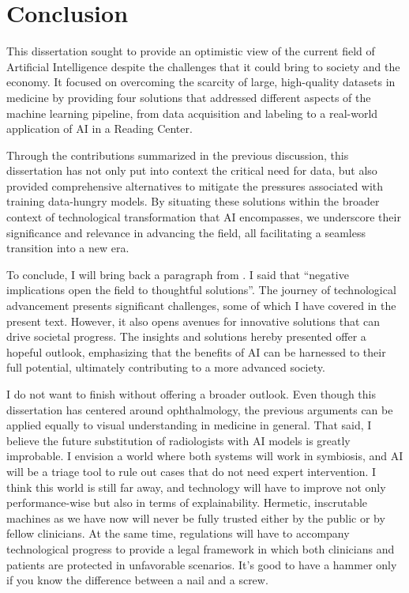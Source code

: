 \graphicspath{{ch8_conclusion/}{Figures/}}

\chapter{Conclusion}
\label{chapter:conclusion}




This dissertation sought to provide an optimistic view of the current field of Artificial Intelligence despite the challenges that it could bring to society and the economy. It focused on overcoming the scarcity of large, high-quality datasets in medicine by providing four solutions that addressed different aspects of the machine learning pipeline, from data acquisition and labeling to a real-world application of AI in a Reading Center.

Through the contributions summarized in the previous discussion, this dissertation has not only put into context the critical need for data, but also provided comprehensive alternatives to mitigate the pressures associated with training data-hungry models. By situating these solutions within the broader context of technological transformation that AI encompasses, we underscore their significance and relevance in advancing the field, all facilitating a seamless transition into a new era.

To conclude, I will bring back a paragraph from . I said that ``negative implications open the field to thoughtful solutions''. The journey of technological advancement presents significant challenges, some of which I have covered in the present text. However, it also opens avenues for innovative solutions that can drive societal progress. The insights and solutions hereby presented offer a hopeful outlook, emphasizing that the benefits of AI can be harnessed to their full potential, ultimately contributing to a more advanced society. 

I do not want to finish without offering a broader outlook. Even though this dissertation has centered around ophthalmology, the previous arguments can be applied equally to visual understanding in medicine in general. That said, I believe the future substitution of radiologists with AI models is greatly improbable. I envision a world where both systems will work in symbiosis, and AI will be a triage tool to rule out cases that do not need expert intervention. I think this world is still far away, and technology will have to improve not only performance-wise but also in terms of explainability. Hermetic, inscrutable machines as we have now will never be fully trusted either by the public or by fellow clinicians. At the same time, regulations will have to accompany technological progress to provide a legal framework in which both clinicians and patients are protected in unfavorable scenarios. It's good to have a hammer only if you know the difference between a nail and a screw.

